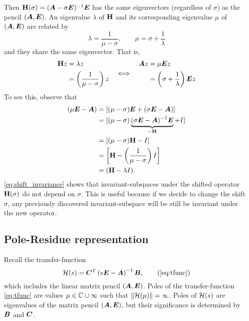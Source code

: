 \smallskip
Then $\textbf{\textup{H}}(\sigma)=(\bm{A}-\sigma \bm{E})^{-1} \bm{E}$ has the same eigenvectors (regardless of $\sigma$) as the pencil $(\bm{A},\bm{E})$.   An eigenvalue $\lambda$ of $\textbf{\textup{H}}$ and its corresponding eigenvalue $\mu$ of $(\bm{A},\bm{E})$ are related by   
\begin{equation}
      \lambda = \frac{1}{\mu-\sigma}, \qquad \mu = \sigma + \frac{1}{\lambda}
	\label{eq:pole_eig}
\end{equation}
and they share the same eigenvector. That is, 
\[
\begin{aligned}
\textbf{\textup{H}} z &= \lambda z \\
&= \left( \frac{1}{\mu-\sigma} \right) z
\end{aligned}
 \quad \Longleftrightarrow \quad 
\begin{aligned}
\bm{A} z &= \mu \bm{E} z \\
&= \left(\sigma + \frac{1}{\lambda}\right)\bm{E} z
\end{aligned} 	
\]
To see this, observe that 
\begin{equation}
\begin{aligned}
(\mu \bm{E} - \bm{A}) &= \left[ (\mu-\sigma)\bm{E} + (\sigma \bm{E}-\bm{A})                     \right]  \\
&= [ (\mu-\sigma)\underbrace{(\sigma \bm{E}-\bm{A})^{-1}\bm{E}}_{-\textbf{\textup{H}}} + I ]  \\
&= \left[ (\mu-\sigma)\textbf{\textup{H}} - I                                \right]  \\
&= \left[ \textbf{\textup{H}}-\left(\frac{1}{\mu-\sigma}\right)I             \right]  \\
&= ( \textbf{\textup{H}}-\lambda I  ) .
\end{aligned}
\label{eq:shift_invariance}
\end{equation}
\eqref{eq:shift_invariance} shows that invariant-subspaces  under the shifted operator $\textbf{\textup{H}}(\sigma)$ do not depend on $\sigma$.  This is useful because if we decide to change the shift $\sigma$, any previously discovered invariant-subspace  will be still be invariant under the new operator.

\subsection{Pole-Residue representation}\label{sec:pole_residue}
Recall the transfer-function  
\begin{equation}
\tf(s) = \CC^T\left(s\E-\A\right)^{-1}\BB,\tag{\ref{eq:tfunc}}
\end{equation}
which includes the linear matrix pencil $(\bm{A},\bm{E})$.  
Poles of the transfer-function \eqref{eq:tfunc} are values $\mu\in\mathbb{C} \cup \infty$ such that $\|\mathcal{H}(\mu)\|=\infty$. Poles of $\mathcal{H}(s)$ are eigenvalues of the matrix pencil $(\bm{A},\bm{E})$, but their significance is determined by $\bm{B}$ and $\bm{C}$. 

